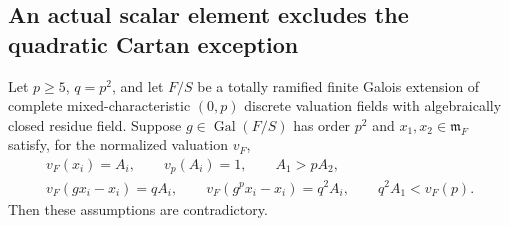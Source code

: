 \subsection{An actual scalar element excludes the quadratic Cartan exception}

\begin{lemma}
\label{lem:B-RD102-scalar}
Let $p\ge5$, $q=p^2$, and let $F/S$ be a totally
ramified finite Galois extension of complete
mixed-characteristic $(0,p)$ discrete valuation fields
with algebraically closed residue field.
Suppose $g\in\operatorname{Gal}(F/S)$ has order $p^2$
and $x_1,x_2\in\mathfrak m_F$ satisfy, for the normalized
valuation $v_F$,
\[
\begin{gathered}
 v_F(x_i)=A_i,\qquad v_p(A_i)=1,\qquad A_1>pA_2,\\
 v_F(gx_i-x_i)=qA_i,\qquad
 v_F(g^px_i-x_i)=q^2A_i,\qquad
 q^2A_1<v_F(p).
\end{gathered}                                           \tag{B-RD102.1}
\]
Then these assumptions are contradictory.
\end{lemma}
